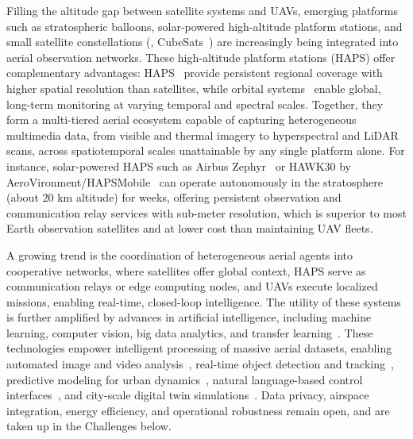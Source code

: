 Filling the altitude gap between satellite systems and UAVs, emerging platforms such as stratospheric balloons, solar-powered high-altitude platform stations, and small satellite constellations (\eg, CubeSats~\cite{lemmer2017propulsion}) are increasingly being integrated into aerial observation networks.
These high-altitude platform stations (HAPS) offer complementary advantages: HAPS~\cite{gonzalo2018capabilities} provide persistent regional coverage with higher spatial resolution than satellites, while orbital systems~\cite{cunningham2004national} enable global, long-term monitoring at varying temporal and spectral scales.
Together, they form a multi-tiered aerial ecosystem capable of capturing heterogeneous multimedia data, from visible and thermal imagery to hyperspectral and LiDAR scans, across spatiotemporal scales unattainable by any single platform alone.
For instance, solar-powered HAPS such as Airbus Zephyr~\cite{kothe2019flight} or HAWK30 by AeroVironment/HAPSMobile~\cite{fladeland2019demonstrating} can operate autonomously in the stratosphere (about 20 km altitude) for weeks, offering persistent observation and communication relay services with sub-meter resolution, which is superior to most Earth observation satellites and at lower cost than maintaining UAV fleets.

A growing trend is the coordination of heterogeneous aerial agents into cooperative networks, where satellites offer global context, HAPS serve as communication relays or edge computing nodes, and UAVs execute localized missions, enabling real-time, closed-loop intelligence. The utility of these systems is further amplified by advances in artificial intelligence, including machine learning, computer vision, big data analytics, and transfer learning~\cite{wang2024multiple,wang2022learning,zheng2022adaptive}. These technologies empower intelligent processing of massive aerial datasets, enabling automated image and video analysis~\cite{liu2023robust,li2021uav,9854892,zheng2019unsupervised,wang2023context,ju2025video2bev}, real-time object detection and tracking~\cite{zhang2019eye,wen2021detection}, predictive modeling for urban dynamics~\cite{fang2022cognitive,shi2022geometry}, natural language-based control interfaces~\cite{chu2024towards}, and city-scale digital twin simulations~\cite{zheng2022citysim}. Data privacy, airspace integration, energy efficiency, and operational robustness remain open, and are taken up in the Challenges below.


